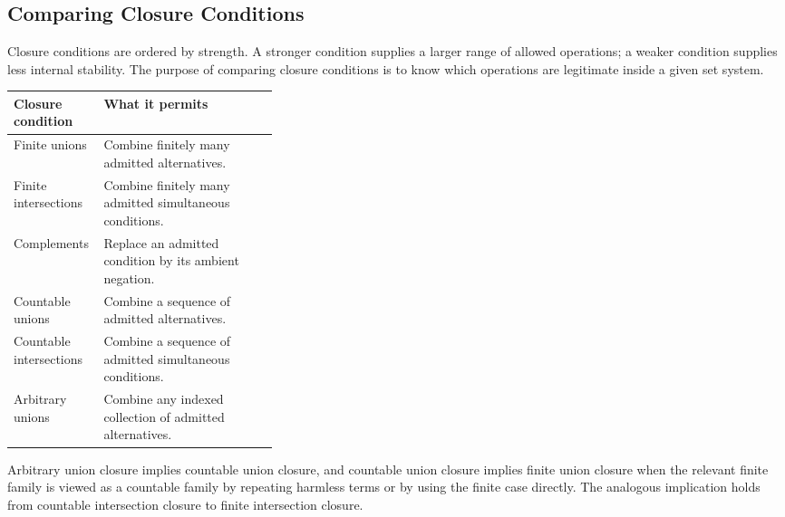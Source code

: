 \subsection{Comparing Closure Conditions}

\begin{remark*}[Exposition]
Closure conditions are ordered by strength.  A stronger condition supplies a
larger range of allowed operations; a weaker condition supplies less internal
stability.  The purpose of comparing closure conditions is to know which
operations are legitimate inside a given set system.
\end{remark*}

\begin{remark*}
\begin{center}
\small
\renewcommand{\arraystretch}{1.2}
\begin{tabularx}{\linewidth}{>{\raggedright\arraybackslash}p{0.34\linewidth}
                            >{\raggedright\arraybackslash}X}
\toprule
\textbf{Closure condition} & \textbf{What it permits} \\
\midrule
Finite unions & Combine finitely many admitted alternatives. \\
Finite intersections & Combine finitely many admitted simultaneous conditions. \\
Complements & Replace an admitted condition by its ambient negation. \\
Countable unions & Combine a sequence of admitted alternatives. \\
Countable intersections & Combine a sequence of admitted simultaneous conditions. \\
Arbitrary unions & Combine any indexed collection of admitted alternatives. \\
\bottomrule
\end{tabularx}
\end{center}
\end{remark*}

\begin{remark*}[Implications]
Arbitrary union closure implies countable union closure, and countable union
closure implies finite union closure when the relevant finite family is viewed
as a countable family by repeating harmless terms or by using the finite case
directly.  The analogous implication holds from countable intersection closure
to finite intersection closure.
\end{remark*}

